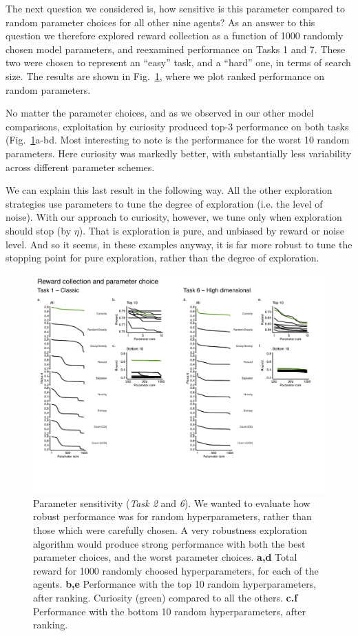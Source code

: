 The next question we considered is, how sensitive is this parameter compared to random parameter choices for all other nine agents? As an answer to this question we therefore explored reward collection as a function of 1000 randomly chosen model parameters, and reexamined performance on Tasks 1 and 7. These two were chosen to represent an ``easy'' task, and a ``hard'' one, in terms of search size. The results are shown in Fig.~\ref{fig:robust}, where we plot ranked performance on random parameters. 

No matter the parameter choices, and as we observed in our other model comparisons, exploitation by curiosity produced top-3 performance on both tasks (Fig.~\ref{fig:robust}a-bd. Most interesting to note is the performance for the worst 10 random parameters. Here curiosity was markedly better, with substantially less variability across different parameter schemes. 

We can explain this last result in the following way. All the other exploration strategies use parameters to tune the degree of exploration (i.e. the level of noise). With our approach to curiosity, however, we tune only when exploration should stop (by $\eta$). That is exploration is pure, and unbiased by reward or noise level. And so it seems, in these examples anyway, it is far more robust to tune the stopping point for pure exploration, rather than the degree of exploration.

\begin{figure}
	\includegraphics[width=11.4cm]{img/robust.pdf} 
	\caption{Parameter sensitivity (\textit{Task 2} and \textit{6}). We wanted to evaluate how robust performance was for random hyperparameters, rather than those which were carefully chosen. A very robustness exploration algorithm would produce strong performance with both the best parameter choices, and the worst parameter choices. 
	\textbf{a,d} Total reward for 1000 randomly choosed hyperparameters, for each of the agents.
	\textbf{b,e} Performance with the top 10 random hyperparameters, after ranking. Curiosity (green) compared to all the others.
	\textbf{c.f} Performance with the bottom 10 random hyperparameters, after ranking.
	}
	\label{fig:robust}
\end{figure}


